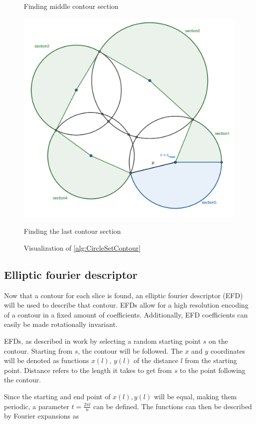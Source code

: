 \begin{figure}[H]
    \caption{Finding middle contour section}
  \endminipage\hfill
    \includegraphics[width=1.0\textwidth]{figures/contour/c3copy.pdf}
    \caption{Finding the last contour section}
  \endminipage
  \caption[Visualization of CircleSetContour algorithm]{Visualization of \autoref{alg:CircleSetContour}}
  \label{fig:circlesetcontour}
\end{figure}


\subsection{Elliptic fourier descriptor}

Now that a contour for each slice is found, an elliptic fourier descriptor (EFD) will be used to describe that contour.
EFDs allow for a high resolution encoding of a contour in a fixed amount of coefficients.
Additionally, EFD coefficients can easily be made rotationally invariant.

EFDs, as described in \cite{LIN1987535} work by selecting a random starting point $s$ on the contour.
Starting from $s$, the contour will be followed. 
The $x$ and $y$ coordinates will be denoted as functions $x(l)$, $y(l)$ of the distance $l$ from the starting point.
Distance refers to the length it takes to get from $s$ to the point following the contour.

Since the starting and end point of $x(l), y(l)$ will be equal, making them periodic, a parameter $t=\frac{2\pi l}{n}$ can be defined. %
The functions can then be described by Fourier expansions as

